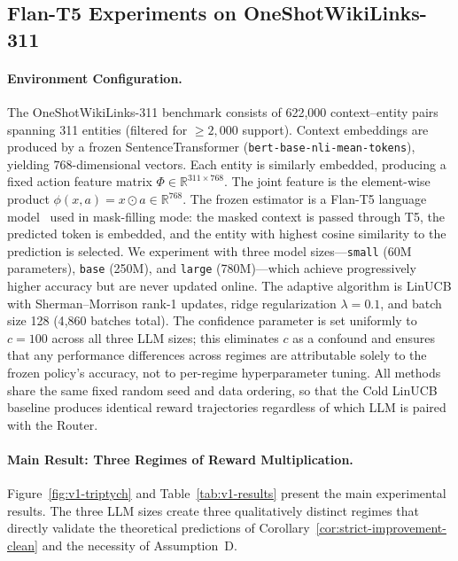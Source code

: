 \subsection{Flan-T5 Experiments on OneShotWikiLinks-311}
\label{sec:wiki_v1}

\paragraph{Environment Configuration.}
The OneShotWikiLinks-311 benchmark consists of 622{,}000 context--entity pairs spanning 311 entities (filtered for $\geq 2{,}000$ support). Context embeddings are produced by a frozen SentenceTransformer (\texttt{bert-base-nli-mean-tokens}), yielding $768$-dimensional vectors. Each entity is similarly embedded, producing a fixed action feature matrix $\Phi \in \mathbb{R}^{311 \times 768}$. The joint feature is the element-wise product $\phi(x,a) = x \odot a \in \mathbb{R}^{768}$. The frozen estimator is a Flan-T5 language model~\cite{chung2024scaling} used in mask-filling mode: the masked context is passed through T5, the predicted token is embedded, and the entity with highest cosine similarity to the prediction is selected. We experiment with three model sizes---\texttt{small} (60M parameters), \texttt{base} (250M), and \texttt{large} (780M)---which achieve progressively higher accuracy but are never updated online. The adaptive algorithm is LinUCB with Sherman--Morrison rank-1 updates, ridge regularization $\lambda = 0.1$, and batch size 128 (4{,}860 batches total). The confidence parameter is set uniformly to $c=100$ across all three LLM sizes; this eliminates $c$ as a confound and ensures that any performance differences across regimes are attributable solely to the frozen policy's accuracy, not to per-regime hyperparameter tuning. All methods share the same fixed random seed and data ordering, so that the Cold LinUCB baseline produces identical reward trajectories regardless of which LLM is paired with the Router.

\paragraph{Main Result: Three Regimes of Reward Multiplication.}
Figure~\ref{fig:v1-triptych} and Table~\ref{tab:v1-results} present the main experimental results. The three LLM sizes create three qualitatively distinct regimes that directly validate the theoretical predictions of Corollary~\ref{cor:strict-improvement-clean} and the necessity of Assumption~D.

